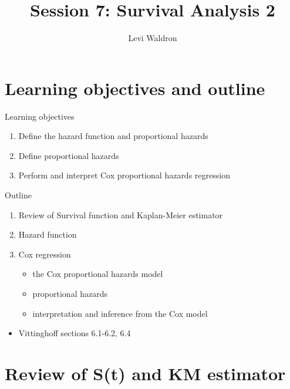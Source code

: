\documentclass[
  ignorenonframetext,
]{beamer}
\title{Session 7: Survival Analysis 2}
\author{Levi Waldron}
\date{}
\institute{CUNY SPH Biostatistics 2}
\providecommand{\tightlist}{%
  \setlength{\itemsep}{0pt}\setlength{\parskip}{0pt}}
\begin{document}
\frame{\titlepage}

\hypertarget{learning-objectives-and-outline}{%
\section{Learning objectives and
outline}\label{learning-objectives-and-outline}}

\begin{frame}{Learning objectives}
\protect\hypertarget{learning-objectives}{}

\begin{enumerate}
\tightlist
\item
  Define the hazard function and proportional hazards
\item
  Define proportional hazards
\item
  Perform and interpret Cox proportional hazards regression
\end{enumerate}

\end{frame}

\begin{frame}{Outline}
\protect\hypertarget{outline}{}

\begin{enumerate}
\tightlist
\item
  Review of Survival function and Kaplan-Meier estimator
\item
  Hazard function
\item
  Cox regression

  \begin{itemize}
  \tightlist
  \item
    the Cox proportional hazards model
  \item
    proportional hazards
  \item
    interpretation and inference from the Cox model
  \end{itemize}
\end{enumerate}

\begin{itemize}
\tightlist
\item
  Vittinghoff sections 6.1-6.2, 6.4
\end{itemize}

\end{frame}

\hypertarget{review-of-st-and-km-estimator}{%
\section{Review of S(t) and KM
estimator}\label{review-of-st-and-km-estimator}}
\end{document}

